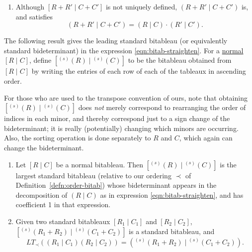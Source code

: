 \documentclass[11pt,reqno]{amsart}
\newcommand{\bitab}[2]{[#1\;|\;#2]}
\newcommand{\bigbitab}[2]{\left[\,\left. #1\;\right|\;#2\,\right]}
\newcommand{\bidet}[2]{(#1\;|\;#2)}
\newcommand{\stdize}[1]{^{(s)}(#1)}
\theoremstyle{definition}
\numberwithin{equation}{section}
\begin{document}
\begin{remark}
\begin{enumerate}
is the only standard bitableau, while if
\[\bitab{R}{C} = \bigbitab{\tableau[s]{1}}{\tableau[s]{2}}, \qquad \text{and} \qquad \bitab{R'}{C'} = \bigbitab{\tableau[s]{\tf{2}}}{\tableau[s]{\tf{1}}},\]
then there is no candidate for $\bitab{R+R'}{C+C'}$ which is a standard bitableau.
\item Although $\bitab{R + R'}{C + C'}$ is not uniquely defined, $\bidet{R+R'}{C+C'}$ is, and satisfies
\[\bidet{R+R'}{C+C'} = \bidet{R}{C} \cdot \bidet{R'}{C'}.\]
\end{enumerate}
\end{remark}

The following result gives the leading standard bitableau (or equivalently standard bideterminant) in the expression \eqref{eqn:bitab-straighten}. For a \hyperlink{def:normal}{normal} $\bitab{R}{C}$, define $\bitab{\stdize{R}}{\stdize{C}}$ to be the bitableau obtained from $\bitab{R}{C}$ by writing the entries of each row of each of the tableaux in ascending order. 

\begin{remark}
For those who are used to the transpose convention of ours, note that obtaining $\bitab{\stdize{R}}{\stdize{C}}$ does \emph{not} merely correspond to rearranging the order of indices in each minor, and thereby correspond just to a sign change of the bideterminant; it is really (potentially) changing which minors are occurring. Also, the sorting operation is done separately to $R$ and $C$, which again can change the bideterminant.
\end{remark}

\begin{theorem}
\label{thm:leading-bd}
\begin{enumerate}[label=(\Roman*),ref=(\Roman*),itemindent=-10pt]
\item Let $\bitab{R}{C}$ be a normal bitableau. Then $\bitab{\stdize{R}}{\stdize{C}}$ is the largest standard bitableau (relative to our ordering $\prec$ of Definition~\ref{defn:order-bitab}) whose bideterminant appears in the decomposition of $\bidet{R}{C}$ as in expression \eqref{eqn:bitab-straighten}, and has coefficient 1 in that expression.
\item Given two standard bitableaux $\bitab{R_1}{C_1}$ and $\bitab{R_2}{C_2}$, $\bitab{\stdize{R_1 + R_2}}{\stdize{C_1 + C_2}}$ is a standard bitableau, and \[LT_{\prec}(\bidet{R_1}{C_1}\bidet{R_2}{C_2}) = \bidet{\stdize{R_1 + R_2}}{\stdize{C_1 + C_2}}.\] 
\end{enumerate}
\end{theorem}
\end{document}
